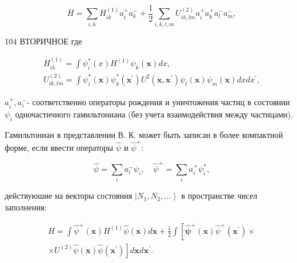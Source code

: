 \documentclass[10pt]{article}
\begin{document}
\[

H=\sum_{i, k} H_{i k}^{(1)} a_{i}^{+} a_{k}^{-}+\frac{1}{2} \sum_{i, k, l, m} U_{i k, l m}^{(2)} a_{i}^{+} a_{k}^{+} a_{l}^{-} a_{m}^{-},

\]



104 ВТОРИЧНОЕ где



\[

\begin{gathered}

H_{i k}^{(1)}=\int \psi_{i}^{*}(x) H^{(1)} \psi_{k}(\boldsymbol{x}) d x, \\

U_{i k, l m}^{(2)}=\int \psi_{i}^{*}(\boldsymbol{x}) \psi_{k}^{*}\left(\boldsymbol{x}^{\prime}\right) U^{2}\left(\boldsymbol{x}, \boldsymbol{x}^{\prime}\right) \psi_{l}(\boldsymbol{x}) \psi_{m}(\boldsymbol{x}) d x d x^{\prime},

\end{gathered}

\]



$a_{i}^{+}, a_{i}^{-}$- соответственно операторы рождения и уничтожения частиц в состоянии $\psi_{i}$ одночастичного гамильтониана (без учета взаимодействия между частицами).



Гамильтониан в представлении В. К. может быть записан в более компактной форме, если ввести операторы $\hat{\psi}$ и $\hat{\psi}^{+}$:



\[

\hat{\psi}=\sum_{i} a_{i}^{-} \psi_{i}, \quad \hat{\psi}^{+}=\sum_{i} a_{i}^{+} \psi_{i}^{*},

\]



действуюшие на векторы состояния $\left|N_{1}, N_{2}, \ldots\right\rangle$ в пространстве чисел заполнения:



\[

\begin{gathered}

H=\int \hat{\psi}^{+}(\boldsymbol{x}) H^{(1)} \hat{\psi}(\boldsymbol{x}) d \boldsymbol{x}+\frac{1}{2} \int\left[\hat{\boldsymbol{\psi}}^{+}(\boldsymbol{x}) \hat{\psi}^{+}\left(\boldsymbol{x}^{\prime}\right) \times\right. \\

\left.\times U^{(2)} \hat{\psi}(\boldsymbol{x}) \hat{\psi}\left(\boldsymbol{x}^{\prime}\right)\right] d \boldsymbol{x} d \boldsymbol{x}^{\prime} .

\end{gathered}

\]
\end{document}

